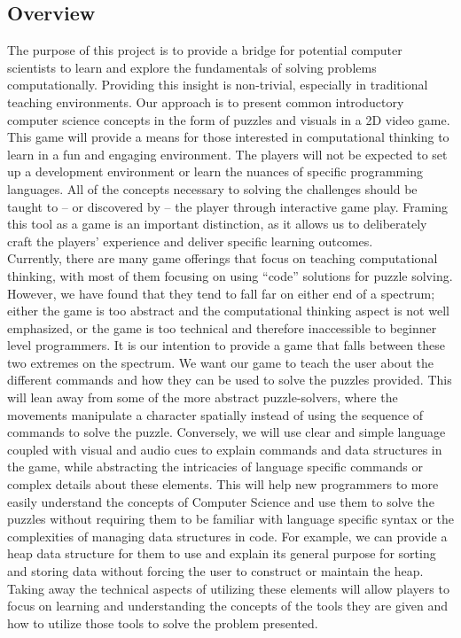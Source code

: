 \subsection{Overview}
The purpose of this project is to provide a bridge for potential computer
scientists to learn and explore the fundamentals of solving problems
computationally. Providing this insight is non-trivial, especially in
traditional teaching environments. Our approach is to present common
introductory computer science concepts in the form of puzzles and visuals in a
2D video game. This game will provide a means for those interested in
computational thinking to learn in a fun and engaging environment. The players
will not be expected to set up a development environment or learn the nuances of
specific programming languages. All of the concepts necessary to solving the
challenges should be taught to -- or discovered by -- the player through interactive
game play. Framing this tool as a game is an important distinction, as it allows
us to deliberately craft the players’ experience and deliver specific learning
outcomes.\\

Currently, there are many game offerings that focus on teaching computational
thinking, with most of them focusing on using “code” solutions for puzzle
solving. However, we have found that they tend to fall far on either end of a
spectrum; either the game is too abstract and the computational thinking aspect
is not well emphasized, or the game is too technical and therefore inaccessible
to beginner level programmers. It is our intention to provide a game that falls
between these two extremes on the spectrum. We want our game to teach the user
about the different commands and how they can be used to solve the puzzles
provided. This will lean away from some of the more abstract puzzle-solvers,
where the movements manipulate a character spatially instead of using the
sequence of commands to solve the puzzle. Conversely, we will use clear and
simple language coupled with visual and audio cues to explain commands and data
structures in the game, while abstracting the intricacies of language specific
commands or complex details about these elements. This will help new programmers
to more easily understand the concepts of Computer Science and use them to solve
the puzzles without requiring them to be familiar with language specific syntax
or the complexities of managing data structures in code. For example, we can
provide a heap data structure for them to use and explain its general purpose
for sorting and storing data without forcing the user to construct or maintain
the heap. Taking away the technical aspects of utilizing these elements will
allow players to focus on learning and understanding the concepts of the tools
they are given and how to utilize those tools to solve the problem presented.


